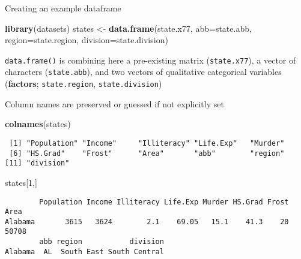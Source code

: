 \documentclass[8pt,ignorenonframetext,]{beamer}
\newenvironment{Shaded}{\begin{snugshade}}{\end{snugshade}}
\newcommand{\KeywordTok}[1]{\textcolor[rgb]{0.13,0.29,0.53}{\textbf{#1}}}
\newcommand{\DataTypeTok}[1]{\textcolor[rgb]{0.13,0.29,0.53}{#1}}
\newcommand{\DecValTok}[1]{\textcolor[rgb]{0.00,0.00,0.81}{#1}}
\newcommand{\StringTok}[1]{\textcolor[rgb]{0.31,0.60,0.02}{#1}}
\newcommand{\NormalTok}[1]{#1}
\begin{document}
\begin{frame}[fragile]{Creating an example dataframe}

\begin{Shaded}
\begin{Highlighting}[]
\KeywordTok{library}\NormalTok{(datasets)}
\NormalTok{states <-}\StringTok{ }\KeywordTok{data.frame}\NormalTok{(state.x77, }\DataTypeTok{abb=}\NormalTok{state.abb, }\DataTypeTok{region=}\NormalTok{state.region, }\DataTypeTok{division=}\NormalTok{state.division)}
\end{Highlighting}
\end{Shaded}

\texttt{data.frame()} is combining here a pre-existing matrix
(\texttt{state.x77}), a vector of characters (\texttt{state.abb}), and
two vectors of qualitative categorical variables (\textbf{factors};
\texttt{state.region}, \texttt{state.division})

Column names are preserved or guessed if not explicitly set

\end{frame}

\begin{frame}[fragile]{}

\begin{Shaded}
\begin{Highlighting}[]
\KeywordTok{colnames}\NormalTok{(states)}
\end{Highlighting}
\end{Shaded}

\begin{verbatim}
 [1] "Population" "Income"     "Illiteracy" "Life.Exp"   "Murder"    
 [6] "HS.Grad"    "Frost"      "Area"       "abb"        "region"    
[11] "division"  
\end{verbatim}

\begin{Shaded}
\begin{Highlighting}[]
\NormalTok{states[}\DecValTok{1}\NormalTok{,]}
\end{Highlighting}
\end{Shaded}

\begin{verbatim}
        Population Income Illiteracy Life.Exp Murder HS.Grad Frost  Area
Alabama       3615   3624        2.1    69.05   15.1    41.3    20 50708
        abb region           division
Alabama  AL  South East South Central
\end{verbatim}

\end{frame}
\end{document}
